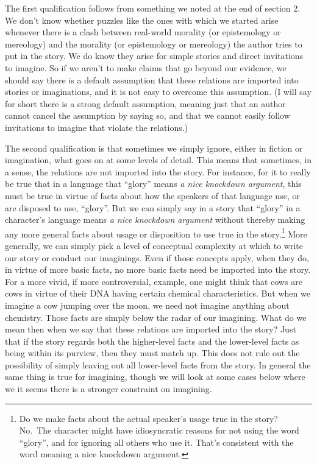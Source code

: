 \documentclass[
  10pt,
  letterpaper,
  DIV=11,
  numbers=noendperiod,
  twoside]{scrartcl}
\begin{document}
The first qualification follows from something we noted at the end of
section 2. We don't know whether puzzles like the ones with which we
started arise whenever there is a clash between real-world morality (or
epistemology or mereology) and the morality (or epistemology or
mereology) the author tries to put in the story. We do know they arise
for simple stories and direct invitations to imagine. So if we aren't to
make claims that go beyond our evidence, we should say there is a
default assumption that these relations are imported into stories or
imaginations, and it is not easy to overcome this assumption. (I will
say for short there is a strong default assumption, meaning just that an
author cannot cancel the assumption by saying so, and that we cannot
easily follow invitations to imagine that violate the relations.)

The second qualification is that sometimes we simply ignore, either in
fiction or imagination, what goes on at some levels of detail. This
means that sometimes, in a sense, the relations are not imported into
the story. For instance, for it to really be true that in a language
that ``glory'' means \emph{a nice knockdown argument}, this must be true
in virtue of facts about how the speakers of that language use, or are
disposed to use, ``glory''. But we can simply say in a story that
``glory'' in a character's language means \emph{a nice knockdown
argument} without thereby making any more general facts about usage or
disposition to use true in the story.\footnote{Do we make facts about
  the actual speaker's usage true in the story? No.~The character might
  have idiosyncratic reasons for not using the word ``glory'', and for
  ignoring all others who use it. That's consistent with the word
  meaning a nice knockdown argument.} More generally, we can simply pick
a level of conceptual complexity at which to write our story or conduct
our imaginings. Even if those concepts apply, when they do, in virtue of
more basic facts, no more basic facts need be imported into the story.
For a more vivid, if more controversial, example, one might think that
cows are cows in virtue of their DNA having certain chemical
characteristics. But when we imagine a cow jumping over the moon, we
need not imagine anything about chemistry. Those facts are simply below
the radar of our imagining. What do we mean then when we say that these
relations are imported into the story? Just that if the story regards
both the higher-level facts and the lower-level facts as being within
its purview, then they must match up. This does not rule out the
possibility of simply leaving out all lower-level facts from the story.
In general the same thing is true for imagining, though we will look at
some cases below where we it seems there is a stronger constraint on
imagining.
\end{document}
